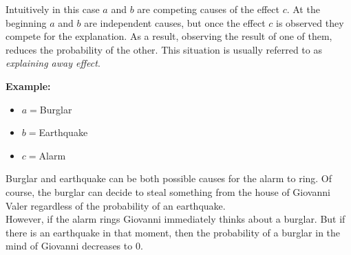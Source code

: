 Intuitively in this case $a$ and $b$ are competing causes of the effect $c$. At
the beginning $a$ and $b$ are independent causes, but once the effect $c$ is observed
they compete for the explanation. As a result, observing the result of one of them,
reduces the probability of the other. This situation is usually referred to as \textit{explaining
away effect}.
\newline

\textbf{Example:}
\begin{itemize}
	\item $a=$Burglar

	\item $b=$Earthquake

	\item $c=$Alarm
\end{itemize}
Burglar and earthquake can be both possible causes for the alarm to ring. Of
course, the burglar can decide to steal something from the house of Giovanni Valer
regardless of the probability of an earthquake.\\ However, if the alarm rings
Giovanni immediately thinks about a burglar. But if there is an earthquake in that
moment, then the probability of a burglar in the mind of Giovanni decreases to
0.

